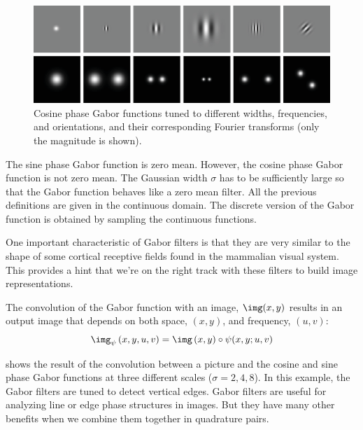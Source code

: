 \begin{figure}
	\centerline{
		\includegraphics[width=1\linewidth]{figures/spatial_filter_sets/gabor_examples_FT.eps} }
	\caption{Cosine phase Gabor functions tuned to different widths, frequencies, and orientations, and their corresponding Fourier transforms (only the magnitude is shown).}
	\label{fig:gabor_ex_ft}
\end{figure}


The sine phase Gabor function is zero mean. However, the cosine phase Gabor function is not zero mean. The Gaussian width $\sigma$ has to be sufficiently large so that the Gabor function behaves like a zero mean filter. All the previous definitions are given in the continuous domain. The discrete version of the Gabor function is obtained by sampling the continuous functions.

One important characteristic of Gabor filters is that they are very similar to the shape of some cortical receptive fields found in the mammalian visual system. This provides a hint that we're on the right track with these filters to build image representations.



The convolution of the Gabor function with an image, $\img (x,y)$ results in an output image that depends on both space, $(x,y)$, and frequency, $(u,v)$:
\begin{equation}
	\label{eq:gaborconv}
	\img_{\psi} \left(x,y,u,v \right) = \img \left(x,y\right) \circ \psi(x,y;u,v)
\end{equation}


\Fig{\ref{fig:gabor_zebra}} shows the result of the convolution between a picture and the cosine and sine phase Gabor functions at three different scales ($\sigma = 2,4,8$). In this example, the Gabor filters are tuned to detect vertical edges. Gabor filters are useful for analyzing line or edge phase structures in images.  But they have many other benefits when we combine them together in quadrature pairs.


